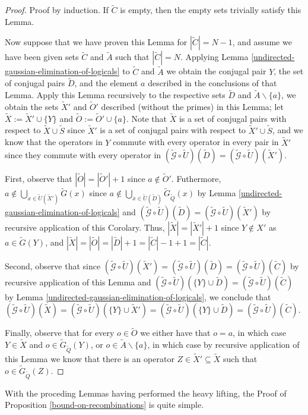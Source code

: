 \documentclass[twocolumn,showpacs,preprintnumbers,amsmath,amssymb,nofootinbib,pra,floatfix]{revtex4-1}
\newenvironment{remark}[1][Remark]{\begin{trivlist}
\item[\hskip \labelsep {\bfseries #1}]}{\end{trivlist}}
\newcommand{\set}{\tilde}
\newcommand{\genfun}{\tilde{\mathcal{G}}}
\begin{document}
\begin{proof}
Proof by induction.  If $\set C$ is empty, then the empty sets trivially satisfy this Lemma.

Now suppose that we have proven this Lemma for $|\set C|=N-1$, and assume we have been given sets $\set C$ and $\set A$ such that $|\set C|=N$.  Applying Lemma \ref{undirected-gaussian-elimination-of-logicals} to $\set C$ and $\set A$ we obtain the conjugal pair $Y$,  the set of conjugal pairs $\set D$, and the element $a$ described in the conclusions of that Lemma.  Apply this Lemma recursively to the respective sets $\set D$ and $\set A\backslash\{a\}$, we obtain the sets $\set X'$ and $\set O'$ described (without the primes) in this Lemma; let $\set X := \set X'\cup\{Y\}$ and $\set O:=\set O'\cup\{a\}$.  Note that $\set X$ is a set of conjugal pairs with respect to $\set X\cup\set S$ since $\set X'$ is a set of conjugal pairs with respect to $\set X'\cup\set S$, and we know that the operators in $Y$ commute with every operator in every pair in $\set X'$ since they commute with every operator in $(\genfun\circ\set U)(\set D)=(\genfun\circ\set U)(\set X')$.

First, observe that $|\set O|=|\set O'|+1$ since $a\notin \set O'$.  Futhermore, $a\notin \bigcup_{x\in \set U(\set X')} \set G(x)$ since $a\notin \bigcup_{x\in \set U(\set D)} \set G_{\set Q}(x)$ by Lemma \ref{undirected-gaussian-elimination-of-logicals} and $(\genfun\circ\set U)(\set D)=(\genfun\circ\set U)(\set X')$ by recursive application of this Corolary.  Thus, $|\set X|=|\set X'|+1$ since $Y\notin X'$ as $a\in\set G(Y)$, and $|\set X|=|\set O|=|\set D|+1=|\set C|-1+1=|\set C|$.

Second, observe that since $(\genfun\circ\set U)(\set X')=(\genfun\circ\set U)(\set D)=(\genfun\circ\set U)(\set C)$ by recursive application of this Lemma and $(\genfun\circ\set U)(\{Y\}\cup\set D)=(\genfun\circ\set U)(\set C)$ by Lemma \ref{undirected-gaussian-elimination-of-logicals}, we conclude that $(\genfun\circ\set U)(\set X) = (\genfun\circ\set U)(\{Y\}\cup\set X') = (\genfun\circ\set U)(\{Y\}\cup\set D) = (\genfun\circ\set U)(\set C)$.

Finally, observe that for every $o\in\set O$ we either have that $o=a$, in which case $Y\in\set X$ and $o\in\set G_{\set Q}(Y)$, or $o\in \set A\backslash\{a\}$, in which case by recursive application of this Lemma we know that there is an operator $Z\in \set X'\subseteq \set X$ such that $o\in\set G_{\set Q}(Z)$.
\end{proof}
\begin{remark}
With the proceding Lemmas having performed the heavy lifting, the Proof of Proposition \ref{bound-on-recombinations} is quite simple.
\end{remark}
\end{document}
